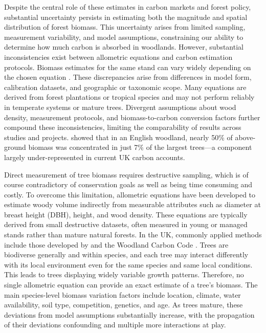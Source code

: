 \documentclass[12pt,a4paper]{article}
\begin{document}
Despite the central role of these estimates in carbon markets and forest policy, substantial uncertainty persists in estimating both the magnitude and spatial distribution of forest biomass. This uncertainty arises from limited sampling, measurement variability, and model assumptions, constraining our ability to determine how much carbon is absorbed in woodlands. However, substantial inconsistencies exist between allometric equations and carbon estimation protocols. Biomass estimates for the same stand can vary widely depending on the chosen equation \citep{Chave2014}. These discrepancies arise from differences in model form, calibration datasets, and geographic or taxonomic scope. Many equations are derived from forest plantations or tropical species and may not perform reliably in temperate systems or mature trees. Divergent assumptions about wood density, measurement protocols, and biomass-to-carbon conversion factors further compound these inconsistencies, limiting the comparability of results across studies and projects. \citet{Calders2022} showed that in an English woodland, nearly 50\% of above-ground biomass was concentrated in just 7\% of the largest trees---a component largely under-represented in current UK carbon accounts.

Direct measurement of tree biomass requires destructive sampling, which is of course contradictory of conservation goals as well as being time consuming and costly. To overcome this limitation, allometric equations have been developed to estimate woody volume indirectly from measurable attributes such as diameter at breast height (DBH), height, and wood density. These equations are typically derived from small destructive datasets, often measured in young or managed stands rather than mature natural forests. In the UK, commonly applied methods include those developed by \citet{Bunce1968} and the Woodland Carbon Code \citep{ForestryCommission2022}. Trees are biodiverse generally and within species, and each tree may interact differently with its local environment even for the same species and same local conditions. This leads to trees displaying widely variable growth patterns. Therefore, no single allometric equation can provide an exact estimate of a tree's biomass. The main species-level biomass variation factors include location, climate, water availability, soil type, competition, genetics, and age. As trees mature, these deviations from model assumptions substantially increase, with the propagation of their deviations confounding and multiple more interactions at play.
\end{document}
